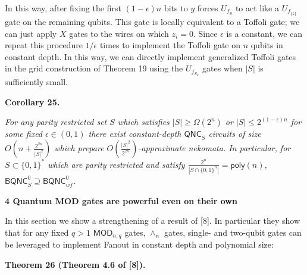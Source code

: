 \documentclass[10pt,a4paper]{article}
\begin{document}
In this way, after fixing the first $(1-\epsilon)n$ bits to $y$ forces $U_{f_{S}}$ to act like a $U_{f_{\{z\}}}$ gate on the remaining qubits. This gate is locally equivalent to a Toffoli gate; we can just apply $X$ gates to the wires on which $z_{i}=0$. Since $\epsilon$ is a constant, we can repeat this procedure $1/\epsilon$ times to implement the Toffoli gate on $n$ qubits in constant depth. In this way, we can directly implement generalized Toffoli gates in the grid construction of Theorem 19 using the $U_{f_{S_{n}}}$ gates when $|S|$ is sufficiently small.\par





\par\medskip\noindent\textbf{
\textbf{Corollary 25}\textbf{.}
}\par



\emph{For any parity restricted set $S$ which satisfies $|S|\geq\Omega(2^{n})$ or $|S|\leq 2^{(1-\epsilon)n}$ for some fixed $\epsilon\in(0,1)$ there exist constant-depth ${\mathsf{QNC}}_{S}$ circuits of size $O(n+\frac{2^{2n}}{|S|^{2}})$ which prepare $O(\frac{|S|^{2}}{2^{2n}})$-approximate nekomata. In particular, for $S\subset\{0,1\}^{*}$ which are parity restricted and satisfy $\frac{2^{n}}{|S\cap\{0,1\}^{n}|}={\mathsf{poly}}(n)$, ${\mathsf{BQNC}}^{0}_{S}\supseteq{\mathsf{BQNC}}^{0}_{wf}$.}\par









\par\medskip\noindent\textbf{
4 Quantum MOD gates are powerful even on their own}\par




In this section we show a strengthening of a result of [8]. In particular they show that for any fixed $q>1$ $\mathsf{MOD}_{n,q}$ gates, $\wedge_{n}$ gates, single- and two-qubit gates can be leveraged to implement Fanout in constant depth and polynomial size:\par





\par\medskip\noindent\textbf{
\textbf{Theorem 26}\textbf{ }(Theorem 4.6 of [8])\textbf{.}
}\par
\end{document}

